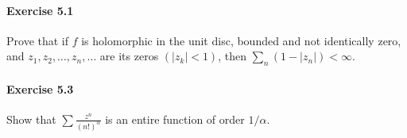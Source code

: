 \documentclass{article}
\begin{document}
\paragraph{Exercise 5.1} Prove that if $f$ is holomorphic in the unit disc, bounded and not identically zero, and $z_{1}, z_{2}, \ldots, z_{n}, \ldots$ are its zeros $\left(\left|z_{k}\right|<1\right)$, then $\sum_{n}\left(1-\left|z_{n}\right|\right)<\infty$.

\paragraph{Exercise 5.3} Show that $\sum \frac{z^{n}}{(n !)^{\alpha}}$ is an entire function of order $1 / \alpha$.
\end{document}
